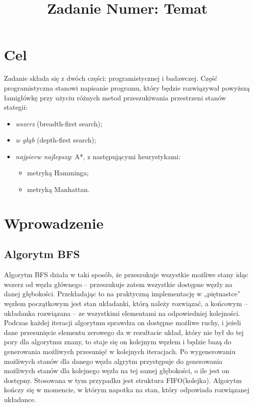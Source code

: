 \documentclass{classrep}
\author{
  \studentinfo{Piotr Polakowski}{247768} \and
  \studentinfo{Jakub Samek}{247781} \and
  \studentinfo{Filip Kobierski}{242336}
}
\title{Zadanie Numer: Temat}
\begin{document}
\maketitle

\section{Cel}
Zadanie składa się z dwóch części: programistycznej i badawczej.
Część programistyczna stanowi napisanie programu, który będzie rozwiązywał powyższą łamigłówkę przy użyciu różnych metod przeszukiwania przestrzeni stanów stategii:
\begin{itemize}
\item \emph{wszerz} (breadth-first search);
\item \emph{w głąb} (depth-first search);
\item \emph{najpierw najlepszy}: A*, z następującymi heurystykami:
  \begin{itemize}
  \item metryką Hamminga;
  \item metryką Manhattan.
  \end{itemize}
\end{itemize}

\section{Wprowadzenie}
\subsection{Algorytm BFS}
Algorytm BFS działa w taki sposób, że przeszukuje wszystkie możliwe stany idąc wszerz od węzła głównego – przeszukuje zatem wszystkie dostępne węzły na danej głębokości. Przekładając to na praktyczną implementację w „piętnastce” węzłem początkowym jest stan układanki, którą należy rozwiązać, a końcowym – układanka rozwiązana – ze wszystkimi elementami na odpowiedniej kolejności. Podczas każdej iteracji algorytmu sprawdza on dostępne możliwe ruchy, i jeżeli dane przesunięcie elementu zerowego da w rezultacie układ, który nie był do tej pory dla algorytmu znany, to staje się on kolejnym węzłem i będzie bazą do generowania możliwych przesunięć w kolejnych iteracjach. Po wygenerowaniu możliwych stanów dla danego węzła algrytm przystępuje do generowania możliwych stanów dla kolejnego węzła na tej samej głębokości, o ile jest on dostępny. Stosowana w tym przypadku jest struktura FIFO(kolejka). Algorytm kończy się w momencie, w którym napotka na stan, który odpowiada rozwiązanej układance.
\end{document}
